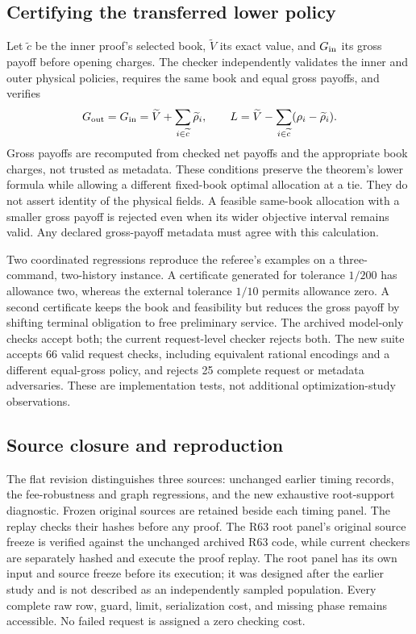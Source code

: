 \documentclass[11pt,letterpaper]{article}
\theoremstyle{definition}\newtheorem{remark}[theorem]{Remark}
\begin{document}
\subsection{Certifying the transferred lower policy}\label{sec:transfer65}
Let $\widetilde c$ be the inner proof's selected book, $\widetilde V$ its exact value, and $G_{\rm in}$ its gross payoff before opening charges. The checker independently validates the inner and outer physical policies, requires the same book and equal gross payoffs, and verifies
\[
 G_{\rm out}=G_{\rm in}=\widetilde V+\sum_{i\in\widetilde c}\widetilde\rho_i,
 \qquad L=\widetilde V-\sum_{i\in\widetilde c}(\rho_i-\widetilde\rho_i).
\]
Gross payoffs are recomputed from checked net payoffs and the appropriate book charges, not trusted as metadata. These conditions preserve the theorem's lower formula while allowing a different fixed-book optimal allocation at a tie. They do not assert identity of the physical fields. A feasible same-book allocation with a smaller gross payoff is rejected even when its wider objective interval remains valid. Any declared gross-payoff metadata must agree with this calculation.

Two coordinated regressions reproduce the referee's examples on a three-command, two-history instance. A certificate generated for tolerance $1/200$ has allowance two, whereas the external tolerance $1/10$ permits allowance zero. A second certificate keeps the book and feasibility but reduces the gross payoff by shifting terminal obligation to free preliminary service. The archived model-only checks accept both; the current request-level checker rejects both. The new suite accepts 66 valid request checks, including equivalent rational encodings and a different equal-gross policy, and rejects 25 complete request or metadata adversaries. These are implementation tests, not additional optimization-study observations.

\subsection{Source closure and reproduction}
The flat revision distinguishes three sources: unchanged earlier timing records, the fee-robustness and graph regressions, and the new exhaustive root-support diagnostic. Frozen original sources are retained beside each timing panel. The replay checks their hashes before any proof. The R63 root panel's original source freeze is verified against the unchanged archived R63 code, while current checkers are separately hashed and execute the proof replay. The root panel has its own input and source freeze before its execution; it was designed after the earlier study and is not described as an independently sampled population. Every complete raw row, guard, limit, serialization cost, and missing phase remains accessible. No failed request is assigned a zero checking cost.
\end{document}
